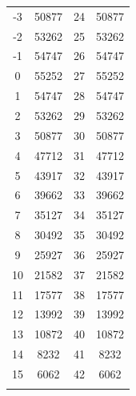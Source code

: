 \begin{table}[H]
\begin{tabular}{cc@{\hspace{12mm}}cc}
         -3 & 50877 &    24 & 50877  \\
         -2 & 53262 &    25 & 53262  \\
         -1 & 54747 &    26 & 54747  \\
          0 & 55252 &    27 & 55252  \\
          1 & 54747 &    28 & 54747  \\
          2 & 53262 &    29 & 53262  \\
          3 & 50877 &    30 & 50877  \\
          4 & 47712 &    31 & 47712  \\
          5 & 43917 &    32 & 43917  \\
          6 & 39662 &    33 & 39662  \\
          7 & 35127 &    34 & 35127  \\
          8 & 30492 &    35 & 30492  \\
          9 & 25927 &    36 & 25927  \\
         10 & 21582 &    37 & 21582  \\
         11 & 17577 &    38 & 17577  \\
         12 & 13992 &    39 & 13992  \\
         13 & 10872 &    40 & 10872  \\
         14 &  8232 &    41 &  8232  \\
         15 &  6062 &    42 &  6062  \\
        \myhline
    \end{tabular}
\end{table}
